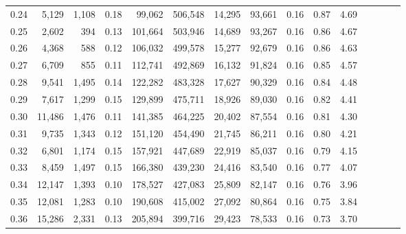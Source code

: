 \begin{tabular}{rrrcrrrrrrrrrrr}
0.24 &   5,129 &  1,108 &                                       0.18 &   99,062 &  506,548 &   14,295 &   93,661 &  0.16 &  0.87 &                         4.69 \\
0.25 &   2,602 &    394 &                                       0.13 &  101,664 &  503,946 &   14,689 &   93,267 &  0.16 &  0.86 &                         4.67 \\
0.26 &   4,368 &    588 &                                       0.12 &  106,032 &  499,578 &   15,277 &   92,679 &  0.16 &  0.86 &                         4.63 \\
0.27 &   6,709 &    855 &                                       0.11 &  112,741 &  492,869 &   16,132 &   91,824 &  0.16 &  0.85 &                         4.57 \\
0.28 &   9,541 &  1,495 &                                       0.14 &  122,282 &  483,328 &   17,627 &   90,329 &  0.16 &  0.84 &                         4.48 \\
0.29 &   7,617 &  1,299 &                                       0.15 &  129,899 &  475,711 &   18,926 &   89,030 &  0.16 &  0.82 &                         4.41 \\
0.30 &  11,486 &  1,476 &                                       0.11 &  141,385 &  464,225 &   20,402 &   87,554 &  0.16 &  0.81 &                         4.30 \\
0.31 &   9,735 &  1,343 &                                       0.12 &  151,120 &  454,490 &   21,745 &   86,211 &  0.16 &  0.80 &                         4.21 \\
0.32 &   6,801 &  1,174 &                                       0.15 &  157,921 &  447,689 &   22,919 &   85,037 &  0.16 &  0.79 &                         4.15 \\
0.33 &   8,459 &  1,497 &                                       0.15 &  166,380 &  439,230 &   24,416 &   83,540 &  0.16 &  0.77 &                         4.07 \\
0.34 &  12,147 &  1,393 &                                       0.10 &  178,527 &  427,083 &   25,809 &   82,147 &  0.16 &  0.76 &                         3.96 \\
0.35 &  12,081 &  1,283 &                                       0.10 &  190,608 &  415,002 &   27,092 &   80,864 &  0.16 &  0.75 &                         3.84 \\
0.36 &  15,286 &  2,331 &                                       0.13 &  205,894 &  399,716 &   29,423 &   78,533 &  0.16 &  0.73 &                         3.70 \\

\end{tabular}
